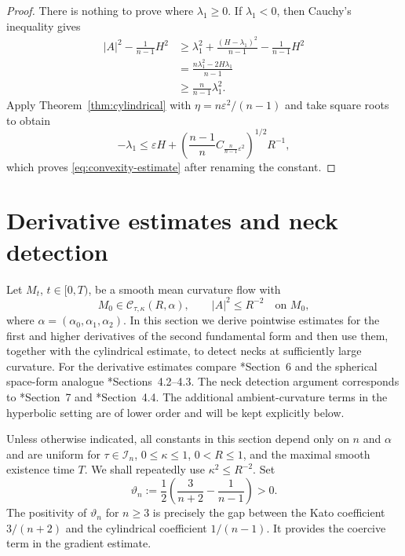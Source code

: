 \documentclass[11pt,reqno]{amsart}
\theoremstyle{definition}
\theoremstyle{remark}
\numberwithin{equation}{section}
\newcommand{\CC}{\mathcal C}
\begin{document}
\begin{proof}
There is nothing to prove where $\lambda_1\geq0$.  If $\lambda_1<0$, then
Cauchy's inequality gives
\begin{align*}
 |A|^2-\frac1{n-1}H^2
 &\geq
 \lambda_1^2+\frac{(H-\lambda_1)^2}{n-1}
 -\frac1{n-1}H^2\\
 &=\frac{n\lambda_1^2-2H\lambda_1}{n-1}\\
 &\geq\frac{n}{n-1}\lambda_1^2.
\end{align*}
Apply Theorem~\ref{thm:cylindrical} with
$\eta=n\varepsilon^2/(n-1)$ and take square roots to obtain
\begin{equation*}
 -\lambda_1
 \leq
 \varepsilon H+
 \left(
 \frac{n-1}{n}
 C_{\frac{n}{n-1}\varepsilon^2}
 \right)^{1/2}R^{-1},
\end{equation*}
which proves \eqref{eq:convexity-estimate} after renaming the constant.
\end{proof}

\section{Derivative estimates and neck detection}
\label{sec:gradient-estimates}

Let $M_t$, $t\in[0,T)$, be a smooth mean curvature flow with
\begin{equation*}
 M_0\in\CC_{\tau,\kappa}(R,\alpha),
 \qquad
 |A|^2\leq R^{-2}\quad\text{on }M_0,
\end{equation*}
where $\alpha=(\alpha_0,\alpha_1,\alpha_2)$.  In this section we derive pointwise estimates for the first and higher
derivatives of the second fundamental form and then use them, together with
the cylindrical estimate, to detect necks at sufficiently large curvature.
For the derivative estimates compare \cite{HS09}*{Section~6} and the
spherical space-form analogue \cite{LN21}*{Sections~4.2--4.3}.  The neck
detection argument corresponds to \cite{HS09}*{Section~7} and
\cite{LN21}*{Section~4.4}.  The additional ambient-curvature terms in the
hyperbolic setting are of lower order and will be kept explicitly below.

Unless otherwise indicated, all constants in this section depend only on
$n$ and $\alpha$ and are uniform for
$\tau\in\mathcal I_n$, $0\leq\kappa\leq1$, $0<R\leq1$, and the maximal
smooth existence time $T$.  We shall repeatedly use $ \kappa^2\leq R^{-2}$.   
Set
\begin{equation*}
 \vartheta_n
 :=\frac12\left(
 \frac3{n+2}-\frac1{n-1}
 \right)>0.
\end{equation*}
The positivity of $\vartheta_n$ for $n\geq3$ is precisely the gap between the
Kato coefficient $3/(n+2)$ and the cylindrical coefficient $1/(n-1)$. It
provides the coercive term in the gradient estimate.
\end{document}
